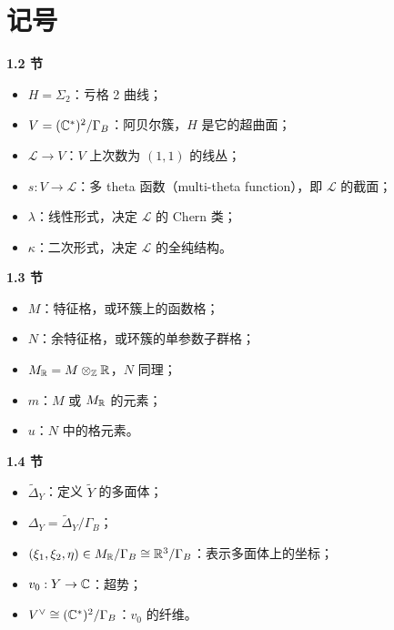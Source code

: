 \section{记号}

\medskip\noindent\textbf{1.2 节}\par
\begin{itemize}[leftmargin=2.2em,itemsep=0.25em]
\item $H=\Sigma_2$：亏格 2 曲线；
\item $V=(\mathbb{C}^*)^2/\Gamma_B$：阿贝尔簇，$H$ 是它的超曲面；
\item $\mathcal{L}\to V$：$V$ 上次数为 $(1,1)$ 的线丛；
\item $s:V\to\mathcal{L}$：多 theta 函数（multi-theta function），即 $\mathcal{L}$ 的截面；
\item $\lambda$：线性形式，决定 $\mathcal{L}$ 的 Chern 类；
\item $\kappa$：二次形式，决定 $\mathcal{L}$ 的全纯结构。
\end{itemize}

\medskip\noindent\textbf{1.3 节}\par
\begin{itemize}[leftmargin=2.2em,itemsep=0.25em]
\item $M$：特征格，或环簇上的函数格；
\item $N$：余特征格，或环簇的单参数子群格；
\item $M_{\mathbb{R}}=M\otimes_{\mathbb{Z}}\mathbb{R}$，$N$ 同理；
\item $m$：$M$ 或 $M_{\mathbb{R}}$ 的元素；
\item $u$：$N$ 中的格元素。
\end{itemize}

\medskip\noindent\textbf{1.4 节}\par
\begin{itemize}[leftmargin=2.2em,itemsep=0.25em]
\item $\widetilde{\Delta}_Y$：定义 $\widetilde{Y}$ 的多面体；
\item $\Delta_Y=\widetilde{\Delta}_Y/\Gamma_B$；
\item $(\xi_1,\xi_2,\eta)\in M_{\mathbb{R}}/\Gamma_B\cong\mathbb{R}^3/\Gamma_B$：表示多面体上的坐标；
\item $v_0:Y\to\mathbb{C}$：超势；
\item $V^\vee\cong(\mathbb{C}^*)^2/\Gamma_B$：$v_0$ 的纤维。
\end{itemize}



